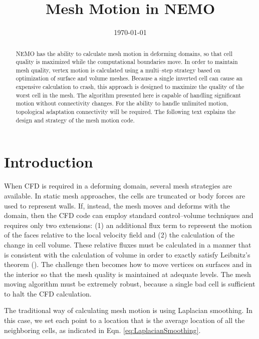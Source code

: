 \documentclass[a4paper,12pt,notitlepage]{article}
\begin{document}
\title{Mesh Motion in NEMO}
\date{\today}

\maketitle

\begin{abstract}
  NEMO has the ability to calculate mesh motion in deforming domains,
  so that cell quality is maximized while the computational boundaries
  move. In order to maintain mesh quality, vertex motion is calculated
  using a multi--step strategy based on optimization of surface and
  volume meshes.  Because a single inverted cell can cause an
  expensive calculation to crash, this approach is designed to
  maximize the quality of the worst cell in the mesh.  The algorithm
  presented here is capable of handling significant
  motion without connectivity changes.  For the ability to handle unlimited motion, topological adaptation connectivity will be  required. The following text explains the design and strategy of the mesh motion code.
\end{abstract}

\medskip

\section{Introduction}
When CFD is required in a deforming domain, several mesh strategies
are available.  In static mesh approaches, the cells are truncated or
body forces are used to represent walls.  If, instead, the mesh moves
and deforms with the domain, then the CFD code can employ standard
control--volume techniques and requires only two extensions: (1) an
additional flux term to represent the motion of the faces relative to
the local velocity field and (2) the calculation of the change in cell
volume.  These relative fluxes must be calculated in a manner that is
consistent with the calculation of volume in order to exactly satisfy
Leibnitz's theorem (\cite{Quan:JCP2007}). The challenge then becomes how to move
vertices on surfaces and in the interior so that the mesh quality is
maintained at adequate levels.  The mesh moving algorithm must be
extremely robust, because a single bad cell is sufficient to halt the
CFD calculation.

The traditional way of calculating mesh motion is using Laplacian
smoothing. In this case, we set each point to a location that is the
average location of all the neighboring cells, as indicated in
Eqn. \ref{eq:LaplacianSmoothing}.
\end{document}
